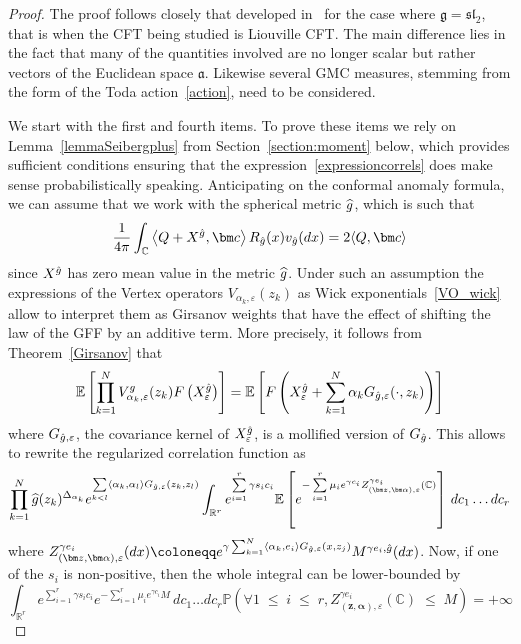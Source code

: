 \documentclass[10pt]{amsart}
\theoremstyle{definition}\newtheorem{defi}[theo]{Definition}\newtheorem{rema}[theo]{Remark}\newtheorem{exam}[theo]{Example}\newtheorem{exem}[theo]{Example}\newtheorem{nota}[theo]{Notation}
\renewcommand{\leq}{\;\leqslant\;}
\newcommand{\frksl}{\mathfrak{sl}}
\newcommand{\frkg}{\mathfrak{g}}
\newcommand{\frka}{\mathfrak{a}}
\newcommand{\C}{\mathbb{C}}
\newcommand{\R}{\mathbb{R}}
\newcommand{\E}{\mathbb{E}}
\newcommand{\bbP}{\mathbb{P}}
\newcommand{\ps}[1]{\langle #1 \rangle}
\newcommand*\eps{\varepsilon}
\newcommand*\green[1]{#1}
\newcommand{\expect}[1]{\mathbb{E}\left[#1\right]}
\let\oldhat\hat
\renewcommand*{\hat}[1]{\mathchoice{\widehat{#1}}{\widehat{#1}}{\oldhat{#1}}{\oldhat{#1}}}
\let\oldforall\forall
\renewcommand*{\forall}{\mathrel{\oldforall}}
\begin{document}
\begin{proof}
The proof follows closely that developed in~\cite{DKRV} for the case where $\frkg=\frksl_2$, that is when the CFT being studied is Liouville CFT. The main difference lies in the fact that many of the quantities involved are no longer scalar but rather vectors of the Euclidean space $\frka$. Likewise several GMC measures, stemming from the form of the Toda action~\eqref{action}, need to be considered.

We start with the first and fourth items. To prove these items we rely on Lemma~\ref{lemmaSeibergplus} from Section~\ref{section:moment} below, which provides sufficient conditions ensuring that the expression~\eqref{expressioncorrels} does make sense probabilistically speaking. Anticipating on the conformal anomaly formula, we can assume that we work with the spherical metric $\hat g$, which is such that
\[
{\frac{1}{4 \pi} \int_{\C} \left\langle Q+X^{\hat g}, \bm c \right\rangle R_{\hat g} (x) v_{\hat g}(dx)=2\ps{Q,\bm c}}
\]
since $X^{\hat g}$ has zero mean value in the metric $\hat g$. Under such an assumption the expressions of the Vertex operators $V_{\alpha_k,\eps}(z_k)$ as Wick exponentials~\eqref{VO_wick} allow to interpret them as Girsanov weights that have the effect of shifting the law of the GFF by an additive term. More precisely, it follows from Theorem~\ref{Girsanov} that
\begin{align}\label{eq:girsanov_VO}
\expect{\prod_{k=1}^N V^g_{\alpha_k,\eps}(z_k) F\left(X_\eps^{\hat g}\right)}=\expect{F\left(X_\eps^{\hat g}+\sum_{k=1}^N\alpha_kG_{\hat g,\eps}(\cdot,z_k)\right)}
\end{align}
where $G_{\hat{g},\eps}$, the covariance kernel of $X^{\hat g}_\eps$, is a mollified version of $G_{\hat{g}}$. This allows to rewrite the regularized correlation function as
\[
\prod_{k=1}^N \hat g (z_k)^{\Delta_{\alpha_k}}e^{ \sum\limits_{ k < l} \left\langle\alpha_k,\alpha_l \right\rangle G_{\hat g,\eps}(z_k,z_l) }\int_{ \R^{r}} e^{\sum\limits_{i=1}^{r}\gamma s_i c_i}\E \left[e^{- \sum\limits_{i=1}^{r} \mu_i e^{\gamma c_i }Z_{\left(\bm z,\bm \alpha\right),\eps}^{\gamma e_i} (\C)} \right]\,dc_1\dots dc_{r}
\]
where $Z_{(\bm z,\bm \alpha),\eps}^{\gamma e_i} (dx)\coloneqq e^{\gamma \sum_{k=1}^N \langle\alpha_k,e_i \rangle G_{\hat{g},\eps} (x,z_j) } M^{\gamma e_i,\hat g}(dx) $. Now, if one of the $s_i$ is non-positive, then the whole integral can be lower-bounded by
\[
\int_{ \R^{r}} e^{\sum\limits_{i=1}^{r}\green\gamma s_i c_i} e^{-\sum\limits_{i=1}^{r} \mu_i e^{\gamma c_i }M}\,dc_1\dots dc_{r}\bbP\left(\forall 1\leq i\leq r,Z_{(\bm z,\bm \alpha),\eps}^{\gamma e_i} (\C) \leq M\right)=+\infty
\]
\end{proof}
\end{document}
